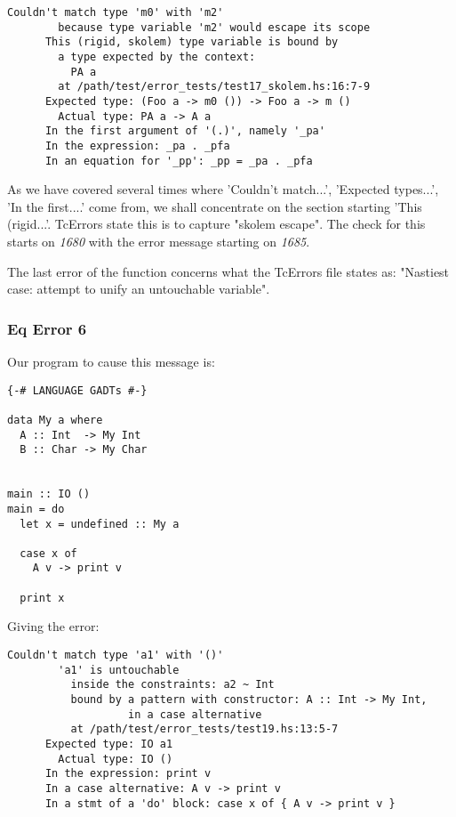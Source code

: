 \documentclass[a4paper]{article}
\begin{document}
\begin{lstlisting}[label={lst: T11.0.2}, numbers=none, caption={Error}]
Couldn't match type 'm0' with 'm2'
        because type variable 'm2' would escape its scope
      This (rigid, skolem) type variable is bound by
        a type expected by the context:
          PA a
        at /path/test/error_tests/test17_skolem.hs:16:7-9
      Expected type: (Foo a -> m0 ()) -> Foo a -> m ()
        Actual type: PA a -> A a
      In the first argument of '(.)', namely '_pa'
      In the expression: _pa . _pfa
      In an equation for '_pp': _pp = _pa . _pfa
\end{lstlisting}

As we have covered several times where 'Couldn't match...', 'Expected types...', 'In the first....' come from, we shall concentrate on the section starting 'This (rigid...'. TcErrors state this is to capture "skolem escape". The check for this starts on \textit{1680} with the error message starting on \textit{1685}. 

The last error of the function concerns what the TcErrors file states as: "Nastiest case: attempt to unify an untouchable variable". 

\pagebreak
\subsubsection{Eq Error 6}


Our program to cause this message is:

\begin{lstlisting}[label={lst: T12.0}, numbers=none, caption={Example Program \cite{ex12}}]
{-# LANGUAGE GADTs #-}

data My a where
  A :: Int  -> My Int
  B :: Char -> My Char


main :: IO ()
main = do
  let x = undefined :: My a

  case x of
    A v -> print v

  print x
\end{lstlisting}
Giving the error:

\begin{lstlisting}[label={lst: T12.0.2}, numbers=none, caption={Error}]
Couldn't match type 'a1' with '()'
        'a1' is untouchable
          inside the constraints: a2 ~ Int
          bound by a pattern with constructor: A :: Int -> My Int,
                   in a case alternative
          at /path/test/error_tests/test19.hs:13:5-7
      Expected type: IO a1
        Actual type: IO ()
      In the expression: print v
      In a case alternative: A v -> print v
      In a stmt of a 'do' block: case x of { A v -> print v }
\end{lstlisting}
\end{document}
